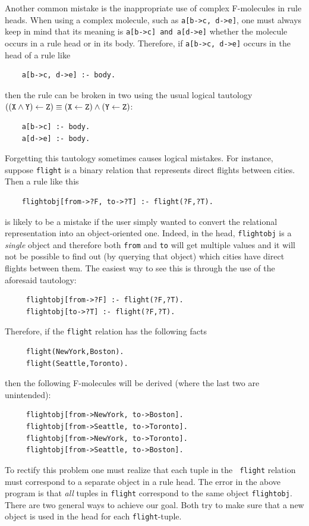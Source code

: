 \documentclass[11pt]{article}
\begin{document}
Another common mistake is the inappropriate use of complex F-molecules in
rule heads. When using a complex molecule, such as {\tt a[b->c, d->e]},
one must always keep in mind that  its meaning is {\tt a[b->c] and a[d->e]}
whether the molecule occurs in a rule head or in its body. Therefore, if
{\tt a[b->c, d->e]} occurs in the head of a rule like
\begin{verbatim}
    a[b->c, d->e] :- body.  
\end{verbatim}
then the rule can be broken in two using the usual logical tautology 
$\tt ((X\wedge Y)\leftarrow Z) \equiv (X\leftarrow Z)\wedge(Y\leftarrow Z)$:
\begin{verbatim}
    a[b->c] :- body.
    a[d->e] :- body.
\end{verbatim}
Forgetting this tautology sometimes causes logical mistakes.
For instance, suppose {\tt flight} is a binary relation that represents
direct flights between cities. Then a rule like this
\begin{verbatim}
    flightobj[from->?F, to->?T] :- flight(?F,?T).  
\end{verbatim}
is likely to be a mistake if the user simply wanted to convert the
relational representation into an object-oriented one. Indeed, in the head,
{\tt flightobj} is a \emph{single} object and therefore both {\tt from} and
{\tt to} will get multiple values and it will not be possible to find out
(by querying that object) which cities have direct flights between them.
The easiest way to see this is through the use of the aforesaid tautology:
\begin{verbatim}
     flightobj[from->?F] :- flight(?F,?T).
     flightobj[to->?T] :- flight(?F,?T).
\end{verbatim}
Therefore, if the {\tt flight} relation has the following facts
\begin{verbatim}
     flight(NewYork,Boston).  
     flight(Seattle,Toronto).  
\end{verbatim}
then the following F-molecules will be derived (where the last two are
unintended):
\begin{verbatim}
     flightobj[from->NewYork, to->Boston].  
     flightobj[from->Seattle, to->Toronto].  
     flightobj[from->NewYork, to->Toronto].  
     flightobj[from->Seattle, to->Boston].  
\end{verbatim}
To rectify this problem one must realize that each tuple in the {\tt
  flight} relation must correspond to a separate object in a rule head.
The error in the above program is that \emph{all} tuples in {\tt flight}
correspond to the same object {\tt flightobj}.  There are two general ways
to achieve our goal. Both try to make sure that a new object is used in
the head for each {\tt flight}-tuple.
\end{document}
